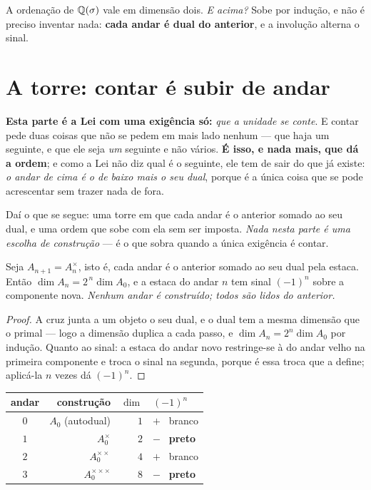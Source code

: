 \documentclass[livro.tex]{subfiles}
\begin{document}
A ordenação de $\mathbb Q(\sigma)$ vale em dimensão dois. \emph{E acima?} Sobe por indução, e não é preciso
inventar nada: \textbf{cada andar é dual do anterior}, e a involução alterna o sinal.

\section{A torre: contar é subir de andar}\label{sec:torreconta}

\noindent \textbf{Esta parte é a Lei com uma exigência só:} \emph{que a unidade se conte}. E contar
pede duas coisas que não se pedem em mais lado nenhum --- que haja um seguinte, e que ele seja
\emph{um} seguinte e não vários. \textbf{É isso, e nada mais, que dá a ordem}; e como a Lei não diz
qual é o seguinte, ele tem de sair do que já existe: \emph{o andar de cima é o de baixo mais o seu
dual}, porque é a única coisa que se pode acrescentar sem trazer nada de fora.

\medskip
\noindent Daí o que se segue: uma torre em que cada andar é o anterior somado ao seu dual, e uma
ordem que sobe com ela sem ser imposta. \emph{Nada nesta parte é uma escolha de construção} --- é o
que sobra quando a única exigência é contar.

\begin{teorema}\label{thm:torrecruz}
Seja $A_{n+1}=A_n^{\times}$, isto é, cada andar é o anterior somado ao seu dual pela estaca.
Então $\dim A_n = 2^{\,n}\dim A_0$, e a estaca do andar $n$ tem sinal $(-1)^{n}$ sobre a
componente nova. \emph{Nenhum andar é construído; todos são lidos do anterior.}
\end{teorema}

\begin{proof}
A cruz junta a um objeto o seu dual, e o dual tem a mesma dimensão que o primal --- logo a
dimensão duplica a cada passo, e $\dim A_n = 2^{n}\dim A_0$ por indução. Quanto ao sinal: a
estaca do andar novo restringe-se à do andar velho na primeira componente e troca o sinal na
segunda, porque é essa troca que a define; aplicá-la $n$ vezes dá $(-1)^{n}$.
\end{proof}

\begin{center}\small
\begin{tabular}{@{}crrl@{}}
\toprule
andar & construção & $\dim$ & $(-1)^{n}$ \\
\midrule
$0$ & $A_0$ (autodual) & $1$ & $+$ \ branco \\
$1$ & $A_0^{\times}$ & $2$ & $-$ \ \textbf{preto} \\
$2$ & $A_0^{\times\times}$ & $4$ & $+$ \ branco \\
$3$ & $A_0^{\times\times\times}$ & $8$ & $-$ \ \textbf{preto} \\
\bottomrule
\end{tabular}
\end{center}
\end{document}
